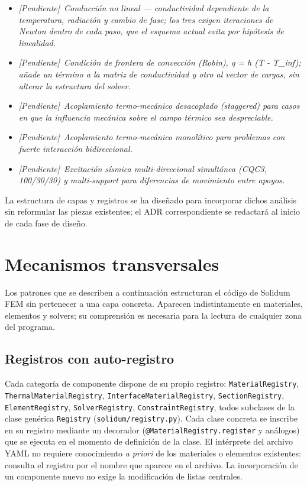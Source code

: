 \documentclass[11pt,oneside]{report}
\newcommand{\pendiente}[1]{\textcolor{pendienteorange}{\textit{[Pendiente]}~\textcolor{pendienteorange}{\textit{#1}}}}
\begin{document}
\begin{itemize}
  \item \pendiente{Conducción no lineal --- conductividad dependiente de la temperatura, radiación y cambio de fase; los tres exigen iteraciones de Newton dentro de cada paso, que el esquema actual evita por hipótesis de linealidad.}
  \item \pendiente{Condición de frontera de convección (Robin), q = h (T - T\_inf); añade un término a la matriz de conductividad y otro al vector de cargas, sin alterar la estructura del solver.}
  \item \pendiente{Acoplamiento termo-mecánico desacoplado (staggered) para casos en que la influencia mecánica sobre el campo térmico sea despreciable.}
  \item \pendiente{Acoplamiento termo-mecánico monolítico para problemas con fuerte interacción bidireccional.}
  \item \pendiente{Excitación sísmica multi-direccional simultánea (CQC3, 100/30/30) y multi-support para diferencias de movimiento entre apoyos.}
\end{itemize}

La estructura de capas y registros se ha diseñado para incorporar dichos análisis sin reformular las piezas existentes; el ADR correspondiente se redactará al inicio de cada fase de diseño.


\newpage

\chapter{Mecanismos transversales}
\label{cap:5}



Los patrones que se describen a continuación estructuran el código de Solidum FEM sin pertenecer a una capa concreta. Aparecen indistintamente en materiales, elementos y solvers; su comprensión es necesaria para la lectura de cualquier zona del programa.

\section{Registros con auto-registro}

Cada categoría de componente dispone de su propio registro: \texttt{MaterialRegistry}, \texttt{ThermalMaterialRegistry}, \texttt{InterfaceMaterialRegistry}, \texttt{SectionRegistry}, \texttt{ElementRegistry}, \texttt{SolverRegistry}, \texttt{ConstraintRegistry}, todos subclases de la clase genérica \texttt{Registry} (\texttt{solidum/\allowbreak{}registry.\allowbreak{}py}). Cada clase concreta se inscribe en su registro mediante un decorador (\texttt{@MaterialRegistry.\allowbreak{}register} y análogos) que se ejecuta en el momento de definición de la clase. El intérprete del archivo YAML no requiere conocimiento \textit{a priori} de los materiales o elementos existentes: consulta el registro por el nombre que aparece en el archivo. La incorporación de un componente nuevo no exige la modificación de listas centrales.
\end{document}
